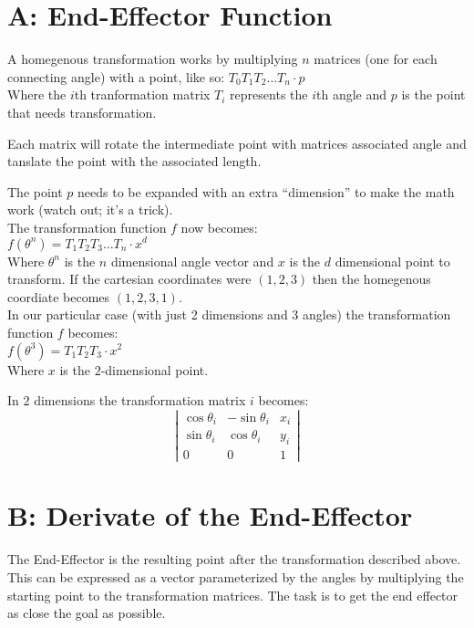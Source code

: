 \documentclass[10pt,oneside,a4paper,final,english]{memoir}
\begin{document}




\maketitle
\newpage

\section*{A: End-Effector Function}
A homegenous transformation works by multiplying $n$ matrices (one for
each connecting angle) with a point, like so: $T_0T_1T_2 \ldots T_n
\cdot p$ \\
Where the $i$th tranformation matrix $T_i$ represents the $i$th angle
and $p$ is the point that needs transformation.

Each matrix will rotate the intermediate point with matrices
associated angle and tanslate the point with the associated length.

The point $p$ needs to be expanded with an extra ``dimension'' to make the math
work (watch out; it's a trick). \\

The transformation function $f$ now becomes: \\
$f(\theta^n) = T_1T_2T_3 \ldots T_n \cdot x^d$ \\
Where $\theta^n$ is the $n$ dimensional angle vector and $x$ is the
$d$ dimensional point to transform. If the cartesian coordinates were
$(1,2,3)$ then the homegenous coordiate becomes $(1,2,3,1)$.\\

In our particular case (with just 2 dimensions and 3 angles) the
transformation function $f$ becomes:\\
$f(\theta^3) = T_1T_2T_3 \cdot x^2$\\
Where $x$ is the $2$-dimensional point.

In $2$ dimensions the transformation matrix $i$ becomes:
\[ \left|
  \begin{array}{ccc}
    \cos\theta_i & -\sin\theta_i & x_i \\
    \sin\theta_i & \cos\theta_i & y_i \\
    0 & 0 & 1
  \end{array}
\right| \]


\section*{B: Derivate of the End-Effector}
The End-Effector is the resulting point after the transformation
described above. This can be expressed as a vector parameterized by
the angles by multiplying the starting point to the transformation
matrices. The task is to get the end effector as close the goal as
possible.
\end{document}
